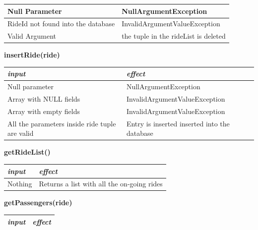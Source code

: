 \documentclass{article}
\begin{document}
\begin{flushleft}
\begin{center}
\begin{tabular}{  |  p{6cm} | p{6cm} |}
    Null Parameter & NullArgumentException 
     \\ 
  \hline
   RideId not found into the database & InvalidArgumentValueException  \\
  \hline
  Valid Argument & the tuple in the rideList is deleted     \\
  \hline
    \end{tabular}
\end{center}

\begin{center}
   \begin {flushleft}
    \textbf{insertRide(ride)}
    \end{flushleft}
        \begin{tabular}{  |  p{6cm} | p{6cm} |}
    \hline
    \textit{input} &  \textit{effect} \\
    \hline
    
   Null parameter & NullArgumentException 
     \\ 
  \hline
  Array with NULL fields & InvalidArgumentValueException  \\
  \hline
  Array with empty fields & InvalidArgumentValueException    \\
  \hline
  All the parameters inside ride tuple are valid & Entry is inserted inserted  into the database \\
  \hline
    \end{tabular}
\end{center}

 
  \begin{center}
   \begin {flushleft}
    \textbf{getRideList()}
    \end{flushleft}
        \begin{tabular}{  |  p{6cm} | p{6cm} |}
    \hline
    \textit{input} &  \textit{effect} \\
    \hline
    
  Nothing & Returns a list with all the on-going rides
     \\ 
  
  \hline
    \end{tabular}
\end{center}

\newpage

  \begin{center}
   \begin {flushleft}
    \textbf{getPassengers(ride)}
    \end{flushleft}
        \begin{tabular}{  |  p{6cm} | p{6cm} |}
    \hline
    \textit{input} &  \textit{effect} \\
    \hline
    

\end{tabular}
\end{center}
\end{flushleft}
\end{document}
